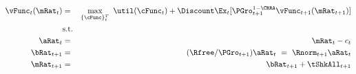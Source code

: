 \begin{eqnarray}
\vFunc_{t}(\mRat_{t}) & = & \max_{\{\cFunc\}_{t}^{T}}~  \util(\cFunc_{t}) +\Discount \Ex_{t}[\PGro_{t+1}^{1-\CRRA}\vFunc_{t+1}({\mRat}_{t+1})]  \label{eq:veqn} \\
& \mbox{s.t.} &  \notag
 \\ {\aRat}_{t} & = & \mRat_{t}-c_{t}  \label{eq:smalls} \notag
 \\ {\bRat}_{t+1} & = & (\Rfree/\PGro_{t+1})\aRat_{t}  ~ = ~ \Rnorm_{t+1}\aRat_{t}  \notag \label{eq:smallb}
\\ \mRat_{t+1} & = & \bRat_{t+1}+\tShkAll_{t+1}  \notag %
\end{eqnarray}
